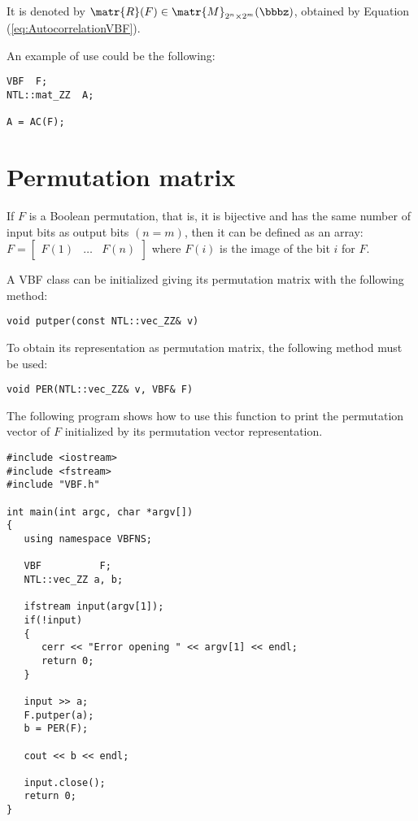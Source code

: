 It is denoted by $\matr{R}(F) \in \matr{M}_{2^n \times 2^m}(\bbbz)$, obtained by Equation
  (\ref{eq:AutocorrelationVBF}).  

An example of use could be the following:

\begin{verbatim}
VBF  F;
NTL::mat_ZZ  A;

A = AC(F);
\end{verbatim}

\section{Permutation matrix}

If $F$ is a Boolean permutation, that is, it is bijective and has the same number of input bits as output bits $(n=m)$, then it can be defined as an array: $F = \begin{bmatrix} F(1)&\dots&F(n) \end{bmatrix}$ where $F(i)$ is the image of the bit $i$ for $F$. 

A VBF class can be initialized giving its permutation matrix with the following method:

\begin{verbatim}
void putper(const NTL::vec_ZZ& v)
\end{verbatim}

To obtain its representation as permutation matrix, the following method must be used:

\begin{verbatim}
void PER(NTL::vec_ZZ& v, VBF& F)
\end{verbatim}

The following program shows how to use this function to print the permutation vector of $F$ initialized by its permutation vector representation.

\begin{verbatim}
#include <iostream>
#include <fstream>
#include "VBF.h"

int main(int argc, char *argv[])
{
   using namespace VBFNS;

   VBF          F;
   NTL::vec_ZZ a, b;

   ifstream input(argv[1]);
   if(!input)
   {
      cerr << "Error opening " << argv[1] << endl;
      return 0;
   }

   input >> a;
   F.putper(a);
   b = PER(F);

   cout << b << endl;

   input.close();
   return 0;
}
\end{verbatim}


